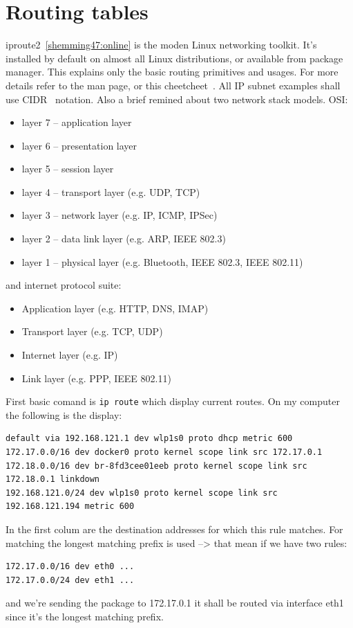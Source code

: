 \documentclass[times, utf8, seminar, english]{fer}
\begin{document}
\chapter{Routing tables}
iproute2~\ref{shemming47:online} is the moden Linux networking toolkit. It's installed by default on almost all Linux distributions, or available from package manager. This explains only the basic routing primitives and usages. For more details refer to the man page, or this cheetcheet~\cite{iproute285:online}. All IP subnet examples shall use CIDR~\cite{Classles63:online} notation. Also a brief remined about two network stack models. OSI:
    \begin{itemize}
        \item layer 7 -- application layer
        \item layer 6 -- presentation layer
        \item layer 5 -- session layer
        \item layer 4 -- transport layer (e.g. UDP, TCP)
        \item layer 3 -- network layer (e.g. IP, ICMP, IPSec)
        \item layer 2 -- data link layer (e.g. ARP, IEEE 802.3)
        \item layer 1 -- physical layer (e.g. Bluetooth, IEEE 802.3, IEEE 802.11)
    \end{itemize}
    and internet protocol suite:
    \begin{itemize}
        \item Application layer (e.g. HTTP, DNS, IMAP)
        \item Transport layer (e.g. TCP, UDP)
        \item Internet layer (e.g. IP)
        \item Link layer (e.g. PPP, IEEE 802.11)
    \end{itemize}

First basic comand is \verb|ip route| which display current routes. On my computer the following is the display:
\begin{verbatim}
default via 192.168.121.1 dev wlp1s0 proto dhcp metric 600
172.17.0.0/16 dev docker0 proto kernel scope link src 172.17.0.1
172.18.0.0/16 dev br-8fd3cee01eeb proto kernel scope link src 172.18.0.1 linkdown
192.168.121.0/24 dev wlp1s0 proto kernel scope link src 192.168.121.194 metric 600
\end{verbatim}
In the first colum are the destination addresses for which this rule matches. For matching the longest matching prefix is used --> that mean if we have two rules:
\begin{verbatim}
172.17.0.0/16 dev eth0 ...
172.17.0.0/24 dev eth1 ...
\end{verbatim}
and we're sending the package to 172.17.0.1 it shall be routed via interface eth1 since it's the longest matching prefix.
\end{document}
